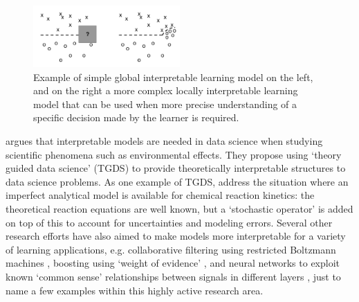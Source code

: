 \begin{figure}[htbp]
    \centering
    \includegraphics[width=0.5\textwidth]{Figures/global_local}
    \caption{Example of simple global interpretable learning model on the left, and on the right a more complex locally interpretable learning model that can be used when more precise understanding of a specific decision made by the learner is required. }
    \label{fig:ruping}
\end{figure}

\citet{Faghmous2014-og} argues that interpretable models are needed in data science when studying scientific phenomena such as environmental effects. They propose using `theory guided data science' (TGDS) to provide theoretically interpretable structures to data science problems. As one example of TGDS, \citet{Morrison2016-fz} address the situation where an imperfect analytical model is available for chemical reaction kinetics: the theoretical reaction equations are well known, but a `stochastic operator' is added on top of this to account for uncertainties and modeling errors. 
Several other research efforts have also aimed to make models more interpretable for a variety of learning applications, e.g. collaborative filtering using restricted Boltzmann machines \citet{Abdollahi2016-vn}, boosting using `weight of evidence' \citet{Ridgeway1998-lv}, and neural networks to exploit known `common sense' relationships between signals in different layers \citet{Choi2016-by}, just to name a few examples within this highly active research area. 

